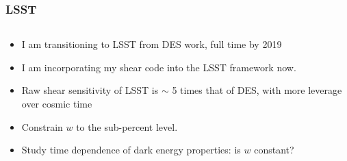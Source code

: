 \documentclass{beamer}
\begin{document}
\frame
{
    \frametitle{LSST}

    \begin{columns}
        \begin{column}{0.5\textwidth}    

            \begin{itemize}

                \item I am transitioning to LSST from DES work, full time by
                    2019

                \item I am incorporating my shear code into the LSST framework
                    now. 

                \item Raw shear sensitivity of LSST is $\sim$ 5 times that of
                    DES, {\color{gold} with more leverage over cosmic time}

                \item Constrain  {\color{gold} $w$} to the sub-percent level.

                \item Study time dependence of dark energy properties: is {\color{gold} $w$ } constant?


\end{itemize}
\end{column}
\end{columns}}
\end{document}
